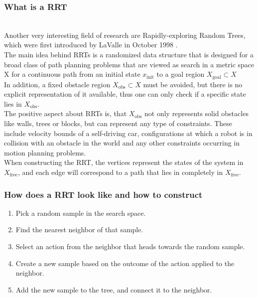 \documentclass[conference]{IEEEtran}
\begin{document}
\subsubsection{What is a RRT}
\quad \\
Another very interesting field of research are Rapidly-exploring Random Trees, which were first introduced by LaValle in October 1998 \cite{LaValle.October1998}.\\
The main idea behind RRTs is a randomized data structure that is designed for a broad class of path planning problems that are viewed as search in a metric space X for a continuous path from an initial state $x_{\text{init}}$ to a goal region $X_\text{goal} \subset X$\\
In addition, a fixed obstacle region $X_\text{obs} \subset X$ must be avoided, but there is no explicit representation of it available, thus one can only check if a specific state lies in $X_\text{obs}$.\\
The positive aspect about RRTs is, that $X_\text{obs}$ not only represents solid obstacles like walls, trees or blocks, but can represent any type of constraints. These include velocity bounds of a self-driving car, configurations at which a robot is in collision with an obstacle in the world and any other constraints occurring in motion planning problems.\\
When constructing the RRT, the vertices represent the states of the system in $X_\text{free}$, and each edge will correspond to a path that lies in completely in $X_\text{free}$. \cite{LaValle.October1998}\\

\subsubsection{How does a RRT look like and how to construct}
\begin{enumerate}
\item Pick a random sample in the search space.
\item Find the nearest neighbor of that sample.
\item Select an action from the neighbor that heads towards the random sample.
\item Create a new sample based on the outcome of the action applied to the neighbor.
\item Add the new sample to the tree, and connect it to the neighbor.
\end{enumerate}
\end{document}
